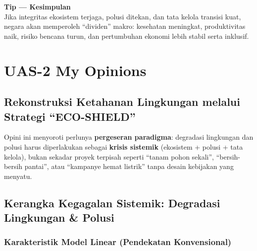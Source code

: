 \documentclass[
  letterpaper,
  DIV=11,
  numbers=noendperiod]{scrreprt}
\begin{document}
\textbf{Tip --- Kesimpulan}\\
Jika integritas ekosistem terjaga, polusi ditekan, dan tata kelola
transisi kuat, negara akan memperoleh ``dividen'' makro: kesehatan
meningkat, produktivitas naik, risiko bencana turun, dan pertumbuhan
ekonomi lebih stabil serta inklusif.


\chapter{UAS-2 My Opinions}\label{uas-2-my-opinions}

\section{Rekonstruksi Ketahanan Lingkungan melalui Strategi
``ECO-SHIELD''}\label{rekonstruksi-ketahanan-lingkungan-melalui-strategi-eco-shield}

\begin{tcolorbox}[enhanced jigsaw, colback=white, colframe=quarto-callout-note-color-frame, left=2mm, arc=.35mm, bottomrule=.15mm, opacityback=0, opacitybacktitle=0.6, coltitle=black, toprule=.15mm, colbacktitle=quarto-callout-note-color!10!white, breakable, titlerule=0mm, leftrule=.75mm, title=\textcolor{quarto-callout-note-color}{\faInfo}\hspace{0.5em}{Posisi Opini}, toptitle=1mm, bottomtitle=1mm, rightrule=.15mm]

Opini ini menyoroti perlunya \textbf{pergeseran paradigma}: degradasi
lingkungan dan polusi harus diperlakukan sebagai \textbf{krisis
sistemik} (ekosistem + polusi + tata kelola), bukan sekadar proyek
terpisah seperti ``tanam pohon sekali'', ``bersih-bersih pantai'', atau
``kampanye hemat listrik'' tanpa desain kebijakan yang menyatu.

\end{tcolorbox}

\section{Kerangka Kegagalan Sistemik: Degradasi Lingkungan \&
Polusi}\label{kerangka-kegagalan-sistemik-degradasi-lingkungan-polusi}

\subsection{Karakteristik Model Linear (Pendekatan
Konvensional)}\label{karakteristik-model-linear-pendekatan-konvensional}
\end{document}
